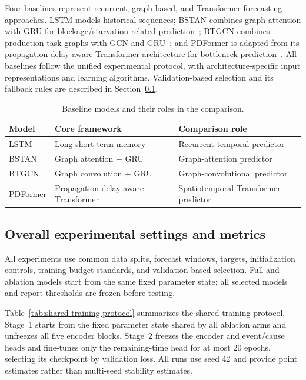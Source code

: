 Four baselines represent recurrent, graph-based, and Transformer forecasting approaches. LSTM models historical sequences; BSTAN combines graph attention with GRU for blockage/starvation-related prediction~\cite{lai2023bstan}; BTGCN combines production-task graphs with GCN and GRU~\cite{yin2025btgcn}; and PDFormer is adapted from its propagation-delay-aware Transformer architecture for bottleneck prediction~\cite{jiang2023pdformer}. All baselines follow the unified experimental protocol, with architecture-specific input representations and learning algorithms. Validation-based selection and its fallback rules are described in Section~\ref{sec:experimental-settings}.

\begin{table}[!htbp]
\centering
\caption{Baseline models and their roles in the comparison.}
\label{tab:exp-baselines}
\footnotesize
\setlength{\tabcolsep}{4pt}
\renewcommand{\arraystretch}{1.10}
\begin{tabularx}{\columnwidth}{@{}lXX@{}}
\toprule
Model & Core framework & Comparison role \\
\midrule
LSTM & Long short-term memory & Recurrent temporal predictor \\
BSTAN & Graph attention + GRU & Graph-attention predictor \\
BTGCN & Graph convolution + GRU & Graph-convolutional predictor \\
PDFormer & Propagation-delay-aware Transformer & Spatiotemporal Transformer predictor \\
\bottomrule
\end{tabularx}
\end{table}

\subsection{Overall experimental settings and metrics}\label{sec:experimental-settings}

All experiments use common data splits, forecast windows, targets, initialization controls, training-budget standards, and validation-based selection. Full and ablation models start from the same fixed parameter state; all selected models and report thresholds are frozen before testing.

Table~\ref{tab:shared-training-protocol} summarizes the shared training protocol. Stage~1 starts from the fixed parameter state shared by all ablation arms and unfreezes all five encoder blocks. Stage~2 freezes the encoder and event/cause heads and fine-tunes only the remaining-time head for at most 20 epochs, selecting its checkpoint by validation loss. All runs use seed 42 and provide point estimates rather than multi-seed stability estimates.

